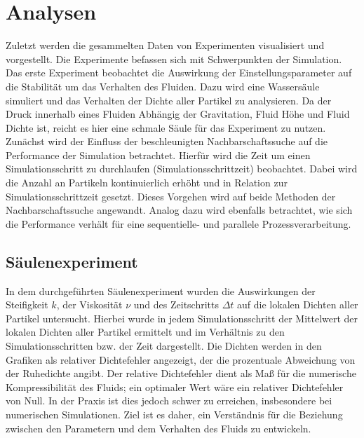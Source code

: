 \documentclass[a4paper, 12pt]{article}
\begin{document}
\section{Analysen} \label{Kap:Alanysen}
Zuletzt werden die gesammelten Daten von Experimenten visualisiert und vorgestellt. Die Experimente befassen sich mit Schwerpunkten der Simulation. Das erste Experiment beobachtet die Auswirkung der Einstellungsparameter auf die Stabilität um das Verhalten des Fluiden. Dazu wird eine Wassersäule simuliert und das Verhalten der Dichte aller Partikel zu analysieren. Da der Druck innerhalb eines Fluiden Abhängig der Gravitation, Fluid Höhe und Fluid Dichte ist, reicht es hier eine schmale Säule für das Experiment zu nutzen. 
Zunächst wird der Einfluss der beschleunigten Nachbarschaftssuche auf die Performance der Simulation betrachtet. Hierfür wird die Zeit um einen Simulationsschritt zu durchlaufen (Simulationsschrittzeit) beobachtet. Dabei wird die Anzahl an Partikeln kontinuierlich erhöht und in Relation zur Simulationsschrittzeit gesetzt. Dieses Vorgehen wird auf beide Methoden der Nachbarschaftssuche angewandt.
Analog dazu wird ebenfalls betrachtet, wie sich die Performance verhält für eine sequentielle- und parallele Prozessverarbeitung.

\subsection{Säulenexperiment}

In dem durchgeführten Säulenexperiment wurden die Auswirkungen der Steifigkeit \(k\), der Viskosität \(\nu\) und des Zeitschritts \(\Delta t\) auf die lokalen Dichten aller Partikel untersucht. Hierbei wurde in jedem Simulationsschritt der Mittelwert der lokalen Dichten aller Partikel ermittelt und im Verhältnis zu den Simulationsschritten bzw. der Zeit dargestellt. Die Dichten werden in den Grafiken als relativer Dichtefehler angezeigt, der die prozentuale Abweichung von der Ruhedichte angibt. Der relative Dichtefehler dient als Maß für die numerische Kompressibilität des Fluids; ein optimaler Wert wäre ein relativer Dichtefehler von Null. In der Praxis ist dies jedoch schwer zu erreichen, insbesondere bei numerischen Simulationen. Ziel ist es daher, ein Verständnis für die Beziehung zwischen den Parametern und dem Verhalten des Fluids zu entwickeln.
\end{document}
